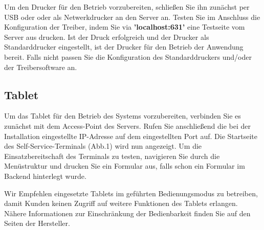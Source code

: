 \noindent Um den Drucker für den Betrieb vorzubereiten, schließen Sie ihn zunächst per USB oder oder als Netwerkdrucker an den Server an. Testen Sie im Anschluss die Konfiguration der Treiber, indem Sie via \textbf{'localhost:631'} eine Testseite vom Server aus drucken. Ist der Druck erfolgreich und der Drucker als Standarddrucker eingestellt, ist der Drucker für den Betrieb der Anwendung bereit. Falls nicht passen Sie die Konfiguration des Standarddruckers und/oder der Treibersoftware an.\\

\subsection{Tablet}

\noindent Um das Tablet für den Betrieb des Systems vorzubereiten, verbinden Sie es zunächst mit dem Access-Point des Servers. Rufen Sie anschließend die bei der Installation eingestellte IP-Adresse auf dem eingestellten Port auf. Die Startseite des Self-Service-Terminals (Abb.1) wird nun angezeigt. Um die Einsatzbereitschaft des Terminals zu testen, navigieren Sie durch die Menüstruktur und drucken Sie ein Formular aus, falls schon ein Formular im Backend hinterlegt wurde.\par
\noindent Wir Empfehlen eingesetzte Tablets im \glqq geführten Bedienungsmodus\grqq{} zu betreiben, damit Kunden keinen Zugriff auf weitere Funktionen des Tablets erlangen. Nähere Informationen zur Einschränkung der Bedienbarkeit finden Sie auf den Seiten der Hersteller.